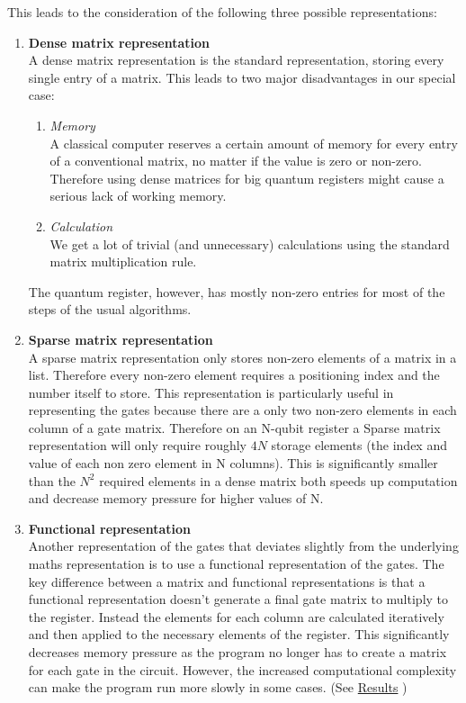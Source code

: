 \documentclass[bibliography=totocnumbered, 10pt]{article}
\theoremstyle{NoticeStyle}
\begin{document}
This leads to the consideration of the following three possible representations:
\begin{enumerate}
	\item \textbf{Dense matrix representation}\\
		A dense matrix representation is the standard representation, storing every single entry of a matrix. This leads to two major disadvantages in our special case:		
		\begin{enumerate}
			\item \textit{Memory}\\
			A classical computer reserves a certain amount of memory for every entry of a conventional matrix, no matter if the value is zero or non-zero. Therefore using dense matrices for big quantum registers might cause a serious lack of working memory.
			\item \textit{Calculation}\\
			We get a lot of trivial (and unnecessary) calculations using the standard matrix multiplication rule.
		\end{enumerate}
		The quantum register, however, has mostly non-zero entries for most of the steps of the usual algorithms.
	\item \textbf{Sparse matrix representation}\\
		A sparse matrix representation only stores non-zero elements of a matrix in a list. Therefore every non-zero element requires a positioning index and the number itself to store. This representation is particularly useful in representing the gates because there are a only two non-zero elements in each column of a gate matrix. Therefore on an N-qubit register a Sparse matrix representation will only require roughly $4N$ storage elements (the index and value of each non zero element in N columns). This is significantly smaller than the $N^2$ required elements in a dense matrix both speeds up computation and decrease memory pressure for higher values of N.
	\item \textbf{Functional representation}\\
		Another representation of the gates that deviates slightly from the underlying maths representation is to use a functional representation of the gates. The key difference between a matrix and functional representations is that a functional representation doesn't generate a final gate matrix to multiply to the register. Instead the elements for each column are calculated iteratively and then applied to the necessary elements of the register. This significantly decreases memory pressure as the program no longer has to create a matrix for each gate in the circuit. However, the increased computational complexity can make the program run more slowly in some cases. (See \hyperref[sec:Results]{Results} )
		
\end{enumerate}
\end{document}
